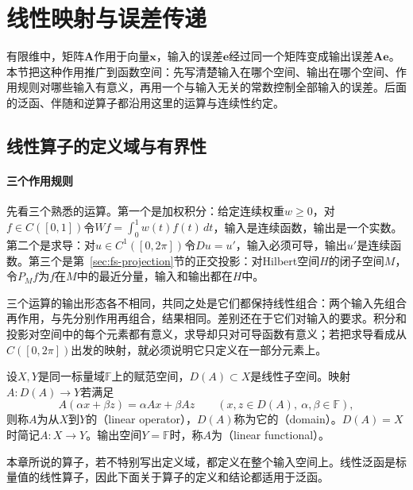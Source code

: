 
\section{线性映射与误差传递}
\label{sec:lfo-operators}

有限维中，矩阵$\bm A$作用于向量$\bm x$，输入的误差$\bm e$经过同一个矩阵变成输出误差$\bm A\bm e$。本节把这种作用推广到函数空间：先写清楚输入在哪个空间、输出在哪个空间、作用规则对哪些输入有意义，再用一个与输入无关的常数控制全部输入的误差。后面的泛函、伴随和逆算子都沿用这里的运算与连续性约定。

\subsection{线性算子的定义域与有界性}
\label{sec:lfo-boundedness}

\paragraph{三个作用规则}
先看三个熟悉的运算。第一个是加权积分：给定连续权重$w\geq0$，对$f\in C([0,1])$令$Wf=\int_0^1w(t)f(t)\,dt$，输入是连续函数，输出是一个实数。第二个是求导：对$u\in C^1([0,2\pi])$令$Du=u'$，输入必须可导，输出$u'$是连续函数。第三个是第~\ref{sec:fs-projection}节的正交投影：对Hilbert空间$H$的闭子空间$M$，令$P_M f$为$f$在$M$中的最近分量，输入和输出都在$H$中。

三个运算的输出形态各不相同，共同之处是它们都保持线性组合：两个输入先组合再作用，与先分别作用再组合，结果相同。差别还在于它们对输入的要求。积分和投影对空间中的每个元素都有意义，求导却只对可导函数有意义；若把求导看成从$C([0,2\pi])$出发的映射，就必须说明它只定义在一部分元素上。

\begin{definition}[线性算子与线性泛函]
\label{def:lfo-linear-operator}
设$X,Y$是同一标量域$\mathbb F$上的赋范空间，$D(A)\subset X$是线性子空间。映射$A:D(A)\to Y$若满足
\[
 A(\alpha x+\beta z)=\alpha Ax+\beta Az\qquad(x,z\in D(A),\ \alpha,\beta\in\mathbb F),
\]
则称$A$为从$X$到$Y$的（linear operator），$D(A)$称为它的（domain）。$D(A)=X$时简记$A:X\to Y$。输出空间$Y=\mathbb F$时，称$A$为（linear functional）。
\end{definition}

本章所说的算子，若不特别写出定义域，都定义在整个输入空间上。线性泛函是标量值的线性算子，因此下面关于算子的定义和结论都适用于泛函。


